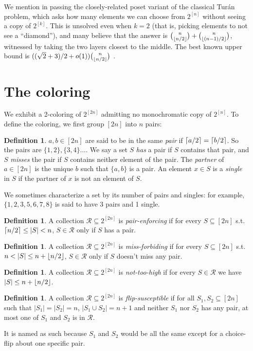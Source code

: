 \documentclass[12pt]{article}
\theoremstyle{definition}
\newtheorem{defi}[thm]{Definition}
\newcommand{\R}{\mathcal{R}}
\newcommand{\dcube}{2^{[2n]}}
\newcommand{\cube}{2^{[n]}}
\renewcommand{\ss}{S\subseteq [2n]}
\newcommand{\ceilh}{\ceil{n/2}}
\newcommand{\floorh}{\floor{n/2}}
\DeclarePairedDelimiter\ceil{\lceil}{\rceil}
\DeclarePairedDelimiter\floor{\lfloor}{\rfloor}
\begin{document}
We mention in passing the closely-related poset variant of the classical Turán problem, which asks how many elements we can choose from $2^{[n]}$ without seeing a copy of $2^{[k]}$. This is unsolved even when $k=2$ \cite{axenovich2012q} (that is, picking elements to not see a ``diamond''), and many believe that the answer is ${n\choose \floorh}+{n\choose \floor{(n-1)/2}}$, witnessed by taking the two layers closest to the middle. The best known upper bound is $(( \sqrt{2} + 3)/2  + o(1)) {n\choose \floor{n/2}}$  \cite{diamondupper}.


\section{The coloring}
We exhibit a 2-coloring of $\dcube$ admitting no monochromatic copy of $\cube$. To define the coloring, we first group $[2n]$ into $n$ pairs:
\begin{defi}
$a,b\in [2n]$ are said to be in the same \textit{pair} if $\ceil {a/2} = \ceil{b/2}$. So the pairs are $\{1,2\},\{3,4\}\dots$. We say a set $S$ \textit{has} a pair if $S$ contains that pair, and $S$ \textit{misses} the pair if $S$ contains neither element of the pair. The \textit{partner} of $a \in [2n]$ is the unique $b$ such that $ \{a,b\}$ is a pair. An element $x \in S$ is a \textit{single} in $S$ if the partner of $x$ is not an element of $S$.
\end{defi}
We sometimes characterize a set by its number of pairs and singles: for example, $\{1,2,3,5,6,7,8\}$ is said to have 3 pairs and 1 single. 

\begin{defi}
A collection $\R \subseteq \dcube$ is \textit{pair-enforcing} if for every $\ss$ s.t. $\ceilh\le |S|<n$, $S \in\R$ only if $S$ has a pair. 
\end{defi}

\begin{defi}
A collection $\R \subseteq \dcube$ is \textit{miss-forbiding} if for every $\ss$ s.t. $n<|S|\le n+\floorh$, $S \in\R$ only if $S$ doesn't miss any pair.
\end{defi}

\begin{defi}
A collection $\R \subseteq \dcube$ is \textit{not-too-high} if for every $S \in\R$ we have $|S|\le n+\floorh$.
\end{defi}

\begin{defi}
A collection $\R \subseteq \dcube$ is \textit{flip-susceptible} if for all $S_1,S_2\subseteq [2n]$ such that $|S_1|=|S_2|=n$, $|S_1\cup S_2|=n+1$ and neither $S_1$ nor $S_2$ has any pair, at most one of $S_1$ and $S_2$ is in $\R$.
\end{defi}
It is named as such because $S_1$ and $S_2$ would be all the same except for a choice-flip about one specific pair.
\end{document}
